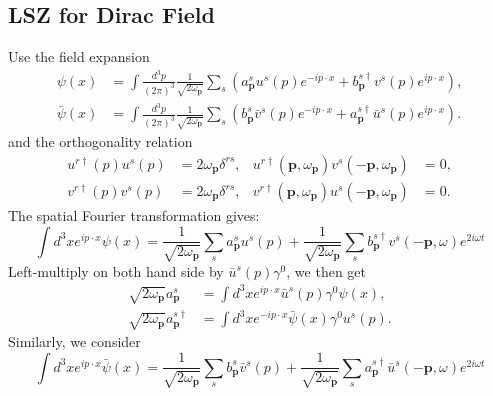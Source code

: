 \subsection{LSZ for Dirac Field}
Use the field expansion
\begin{equation*}
\begin{aligned}
	\psi(x) &=\int \frac{d^{3} p}{(2 \pi)^{3}} \frac{1}{\sqrt{2 \omega_{\mathbf{p}}}} 
		\sum_{s}\left(a_{\mathbf{p}}^{s} u^{s}(p) e^{-i p \cdot x}
		+b_{\mathbf{p}}^{s \dagger} v^{s}(p) e^{i p \cdot x}\right), \\
	\bar{\psi}(x) &=\int \frac{d^{3} p}{(2 \pi)^{3}} \frac{1}{\sqrt{2 \omega_{\mathbf{p}}}} 
		\sum_{s}\left(b_{\mathbf{p}}^{s} \bar{v}^{s}(p) e^{-i p \cdot x}
		+a_{\mathbf{p}}^{s \dagger} \bar{u}^{s}(p) e^{i p \cdot x}\right).
\end{aligned}
\end{equation*}
and the orthogonality relation
\begin{equation*}
\begin{aligned}
	u^{r \dagger}(p) u^{s}(p) &= 2 \omega_{\bm p} \delta^{r s}, & 
	u^{r \dagger}(\bm p,\omega_{\bm p}) v^{s}(-\bm p,\omega_{\bm p}) &= 0,\\
	v^{r \dagger}(p) v^{s}(p) &= 2\omega_{\bm p} \delta^{r s}, & 
	v^{r \dagger}(\bm p,\omega_{\bm p}) u^{s}(-\bm p,\omega_{\bm p}) &= 0.
\end{aligned}
\end{equation*}
The spatial Fourier transformation gives:
\begin{equation*}
	\int d^3x e^{ip\cdot x}\psi(x) = \frac{1}{\sqrt{2\omega_{\bm p}}}\sum_s a^s_{\bm p}u^s(p) +\frac{1}{\sqrt{2\omega_{\bm p}}}\sum_s b^{s \dagger}_{\bm p} v^s(-\bm p,\omega) e^{2i\omega t}
\end{equation*}
Left-multiply on both hand side by $\bar u^{s}(p) \gamma^0$, we then get
\begin{equation*}
\begin{aligned}
	\sqrt{2\omega_{\bm p}}a^{s}_{\bm p} &= \int d^3 x e^{ip\cdot x}\bar u^{s}(p)\gamma^0 \psi(x), \\
	\sqrt{2\omega_{\bm p}}a^{s \dagger}_{\bm p} &= \int d^3 x e^{-ip\cdot x}\bar\psi(x)\gamma^0 u^{s}(p).
\end{aligned}
\end{equation*}
Similarly, we consider
\begin{equation*}
	\int d^3x e^{ip\cdot x}\bar\psi(x) = \frac{1}{\sqrt{2\omega_{\bm p}}}\sum_s b^s_{\bm p}\bar v^s(p) +\frac{1}{\sqrt{2\omega_{\bm p}}}\sum_s a^{s \dagger}_{\bm p} \bar u^s(-\bm p,\omega) e^{2i\omega t}
\end{equation*}
